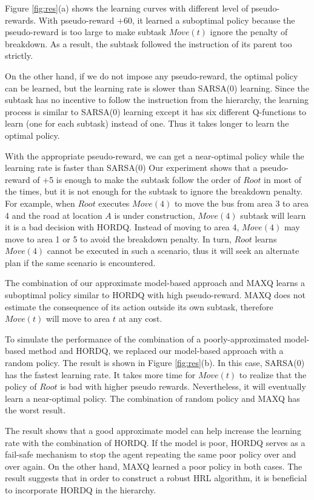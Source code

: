 Figure \ref{fig:res}(a) shows the learning curves with different level of pseudo-rewards.
With pseudo-reward +60, it learned a suboptimal policy because
the pseudo-reward is too large to make subtask $Move(t)$ ignore 
the penalty of breakdown. As a result, the subtask followed 
the instruction of its parent too strictly.

On the other hand, if we do not impose any pseudo-reward, 
the optimal policy can be learned, but the learning rate is
slower than SARSA(0) learning. Since the subtask has no
incentive to follow the instruction from the hierarchy, 
the learning process is similar to SARSA(0) learning 
except it has six different Q-functions to learn (one for each subtask) instead of one.
Thus it takes longer to learn the optimal policy. 

With the appropriate pseudo-reward, we can get a near-optimal policy
while the learning rate is faster than SARSA(0)
Our experiment shows that a pseudo-reward of +5 is enough to make the subtask follow 
the order of $Root$ in most of the times, but it is not enough for the subtask to ignore
the breakdown penalty. For example, when $Root$ executes $Move(4)$ to move the bus from area 
3 to area 4 and the road at location $A$ is under construction, $Move(4)$ subtask
will learn it is a bad decision with HORDQ.
Instead of moving to area 4, $Move(4)$ may move to area 1 or 5 to avoid
the breakdown penalty. In turn, $Root$ learns $Move(4)$ cannot be executed in 
such a scenario, thus it will seek an alternate plan if the same scenario
is encountered.

The combination of our approximate model-based approach and MAXQ learns 
a suboptimal policy similar to HORDQ with high pseudo-reward. MAXQ does not estimate the consequence of its action outside its own subtask, therefore
$Move(t)$ will move to area $t$ at any cost.

To simulate the performance of the combination of a poorly-approximated model-based method and 
HORDQ, we replaced our model-based approach with a random policy.
The result is shown in Figure \ref{fig:res}(b). In this case, SARSA(0) has the fastest
learning rate. It takes more time for $Move(t)$ to realize that the policy of $Root$ is bad with higher pseudo rewards.
Nevertheless, it will eventually learn a near-optimal policy.
The combination of random policy and MAXQ has the worst result.

The result shows that a good approximate model 
can help increase the learning rate with the combination of HORDQ. 
If the model is poor, HORDQ serves as a fail-safe mechanism to stop 
the agent repeating the same poor policy over and over again.
On the other hand, MAXQ learned a poor policy in both cases.  
The result suggests that in order to construct a robust HRL 
algorithm, it is beneficial to incorporate HORDQ in the hierarchy.


